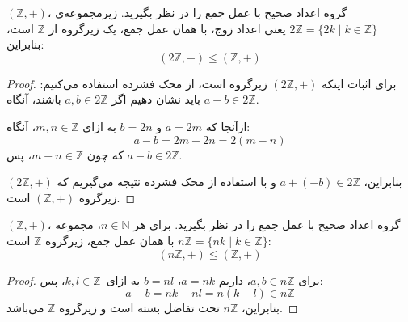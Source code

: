 \begin{example}
    \( (\mathbb{Z}, +) \)، گروه اعداد صحیح با عمل جمع را در نظر بگیرید.
    زیرمجموعه‌ی \( 2\mathbb{Z} = \{ 2k \mid k \in \mathbb{Z} \} \) یعنی اعداد زوج، با همان عمل جمع، یک زیرگروه از \( \mathbb{Z} \) است، بنابراین:
    \[
        (2\mathbb{Z}, +) \leq (\mathbb{Z}, +)
    \]
\end{example}

\begin{proof}
    برای اثبات اینکه \( (2\mathbb{Z}, +) \) زیرگروه است، از محک فشرده استفاده می‌کنیم:
    باید نشان دهیم اگر \( a, b \in 2\mathbb{Z} \) باشند، آنگاه \( a - b \in 2\mathbb{Z} \).

    ازآنجا که \( a = 2m \) و \( b = 2n \)  به ازای \( m, n \in \mathbb{Z} \)، آنگاه:
    \[
        a - b = 2m - 2n = 2(m - n)
    \]
    که چون \( m - n \in \mathbb{Z} \)، پس \( a - b \in 2\mathbb{Z} \).

    بنابراین، \( a + (-b) \in 2\mathbb{Z} \) و با استفاده از محک فشرده نتیجه می‌گیریم که \( (2\mathbb{Z}, +) \) زیرگروه \( (\mathbb{Z}, +) \) است.
\end{proof}

\begin{example}
    \( (\mathbb{Z}, +) \)، گروه اعداد صحیح با عمل جمع را در نظر بگیرید.
    برای هر \( n \in \mathbb{N} \)، مجموعه \( n\mathbb{Z} = \{ nk \mid k \in \mathbb{Z} \} \) با همان عمل جمع، زیرگروه \( \mathbb{Z} \) است:
    \[
        (n\mathbb{Z}, +) \leq (\mathbb{Z}, +)
    \]
\end{example}

\begin{proof}
    برای \( a, b \in n\mathbb{Z} \)، داریم \( a = nk \)، \( b = nl \)  به ازای \( k, l \in \mathbb{Z} \)، پس:
    \[
        a - b = nk - nl = n(k - l) \in n\mathbb{Z}
    \]
    بنابراین، \( n\mathbb{Z} \) تحت تفاضل بسته است و زیرگروه \( \mathbb{Z} \) می‌باشد.
\end{proof}


